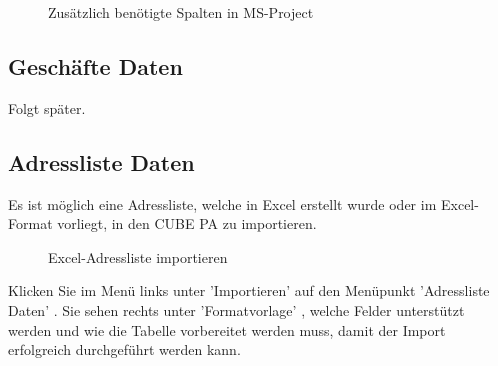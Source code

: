 \begin{figure}[H]
\caption{Zusätzlich benötigte Spalten in MS-Project}
\end{figure}

\subsection{Geschäfte Daten}

Folgt später.

\subsection{Adressliste Daten}

Es ist möglich eine Adressliste, welche in Excel erstellt wurde oder im Excel-Format vorliegt, in den CUBE PA zu importieren. 

\begin{figure}[H]
\caption{Excel-Adressliste importieren}
\end{figure}

Klicken Sie im Menü links unter 'Importieren' auf den Menüpunkt 'Adressliste Daten' . Sie sehen rechts unter 'Formatvorlage' , welche Felder unterstützt werden und wie die Tabelle vorbereitet werden muss, damit der Import erfolgreich durchgeführt werden kann.

